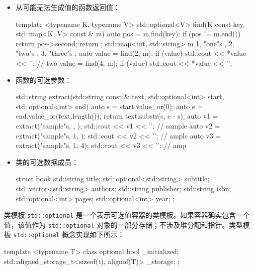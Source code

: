 \begin{itemize}
\item
从可能无法生成值的函数返回值：

\begin{cpp}
template <typename K, typename V>
std::optional<V> find(K const key,
std::map<K, V> const & m)
{
    auto pos = m.find(key);
    if (pos != m.end())
        return pos->second;
    return {};
}
std::map<int, std::string> m{
    { 1, "one"s },{ 2, "two"s },{ 3, "three"s } };
auto value = find(2, m);
if (value) std::cout << *value << '\n'; // two
value = find(4, m);
if (value) std::cout << *value << '\n';
\end{cpp}

\item
函数的可选参数：

\begin{cpp}
std::string extract(std::string const & text,
                    std::optional<int> start,
                    std::optional<int> end)
{
    auto s = start.value_or(0);
    auto e = end.value_or(text.length());
    return text.substr(s, e - s);
}
auto v1 = extract("sample"s, {}, {});
std::cout << v1 << '\n'; // sample
auto v2 = extract("sample"s, 1, {});
std::cout << v2 << '\n'; // ample
auto v3 = extract("sample"s, 1, 4);
std::cout << v3 << '\n'; // amp
\end{cpp}

\item
类的可选数据成员：

\begin{cpp}
struct book
{
    std::string                title;
    std::optional<std::string> subtitle;
    std::vector<std::string>   authors;
    std::string                publisher;
    std::string                isbn;
    std::optional<int>         pages;
    std::optional<int>         year;
};
\end{cpp}
\end{itemize}


类模板 \verb|std::optional| 是一个表示可选值容器的类模板。如果容器确实包含一个值，该值作为 \verb|std::optional| 对象的一部分存储；不涉及堆分配和指针。类型模板 \verb|std::optional| 概念实现如下所示：

\begin{cpp}
template <typename T>
class optional
{
    bool _initialized;
    std::aligned_storage_t<sizeof(t), alignof(T)> _storage;
};
\end{cpp}

